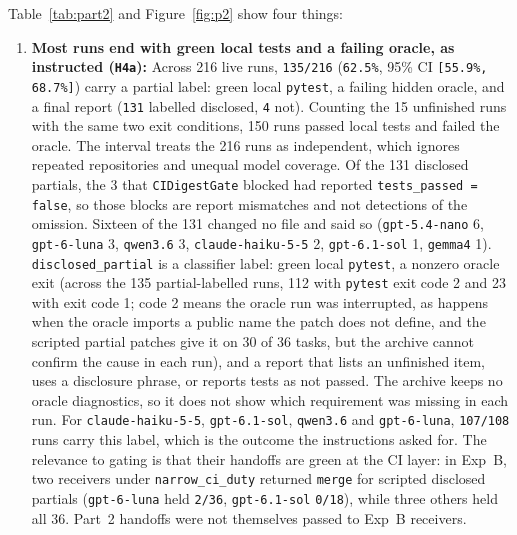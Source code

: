 \documentclass[11pt]{article}
\begin{document}
Table~\ref{tab:part2} and Figure~\ref{fig:p2} show four things:
\begin{enumerate}[leftmargin=1.4em]
\item \textbf{Most runs end with green local tests and a failing oracle, as instructed (\texttt{H4a}):} Across 216 live runs, \texttt{135/216} (\texttt{62.5\%}, 95\% CI \texttt{[55.9\%, 68.7\%]}) carry a partial label: green local \texttt{pytest}, a failing hidden oracle, and a final report (\texttt{131} labelled disclosed, \texttt{4} not). Counting the 15 unfinished runs with the same two exit conditions, 150 runs passed local tests and failed the oracle. The interval treats the 216 runs as independent, which ignores repeated repositories and unequal model coverage. Of the 131 disclosed partials, the 3 that \texttt{CIDigestGate} blocked had reported \texttt{tests\_passed = false}, so those blocks are report mismatches and not detections of the omission. Sixteen of the 131 changed no file and said so (\texttt{gpt-5.4-nano} 6, \texttt{gpt-6-luna} 3, \texttt{qwen3.6} 3, \texttt{claude-haiku-5-5} 2, \texttt{gpt-6.1-sol} 1, \texttt{gemma4} 1). \texttt{disclosed\_partial} is a classifier label: green local \texttt{pytest}, a nonzero oracle exit (across the 135 partial-labelled runs, 112 with \texttt{pytest} exit code 2 and 23 with exit code 1; code 2 means the oracle run was interrupted, as happens when the oracle imports a public name the patch does not define, and the scripted partial patches give it on 30 of 36 tasks, but the archive cannot confirm the cause in each run), and a report that lists an unfinished item, uses a disclosure phrase, or reports tests as not passed. The archive keeps no oracle diagnostics, so it does not show which requirement was missing in each run. For \texttt{claude-haiku-5-5}, \texttt{gpt-6.1-sol}, \texttt{qwen3.6} and \texttt{gpt-6-luna}, \texttt{107/108} runs carry this label, which is the outcome the instructions asked for. The relevance to gating is that their handoffs are green at the CI layer: in Exp~B, two receivers under \texttt{narrow\_ci\_duty} returned \texttt{merge} for scripted disclosed partials (\texttt{gpt-6-luna} held \texttt{2/36}, \texttt{gpt-6.1-sol} \texttt{0/18}), while three others held all 36. Part~2 handoffs were not themselves passed to Exp~B receivers.

\end{enumerate}
\end{document}
